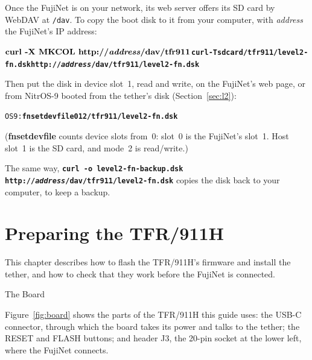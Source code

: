 \documentclass[10pt,twoside,openany]{book}
\makeatletter
\newcommand{\cmd}[1]{\textbf{#1}}            %
\newcommand{\var}[1]{\textit{#1}}            %
\newcommand{\file}[1]{\texttt{#1}}           %
\newcommand{\key}[1]{\textsf{\small #1}}     %
\newcommand{\type}[1]{\texttt{\textbf{#1}}}  %
\newenvironment{ex}{\par\vspace{0.3ex}\small\begin{alltt}}{\end{alltt}\vspace{0.3ex}}
\newcommand{\thesectname}{}
\newcommand{\chapterpages}{%
  \renewcommand{\thepage}{\thechapter--\arabic{page}}\setcounter{page}{1}}
\renewcommand{\section}{\@startsection{section}{1}{0pt}{3.2ex plus 1ex}{1.2ex}%
  {\sffamily\bfseries\large}}
\makeatother
\begin{document}
Once the FujiNet is on your network, its web server offers its SD card by
WebDAV at \file{/dav}. To copy the boot disk to it from your computer, with
\var{address} the FujiNet's IP address:
\begin{ex}
$ \textbf{curl -X MKCOL http://\var{address}/dav/tfr911}
$ \textbf{curl -T sdcard/tfr911/level2-fn.dsk http://\var{address}/dav/tfr911/level2-fn.dsk}
\end{ex}
Then put the disk in device slot~1, read and write, on the FujiNet's web
page, or from NitrOS-9 booted from the tether's disk (Section~\ref{sec:l2}):
\begin{ex}
OS9: \textbf{fnsetdevfile 0 1 2 /tfr911/level2-fn.dsk}
\end{ex}
(\cmd{fnsetdevfile} counts device slots from~0: slot~0 is the FujiNet's
slot~1. Host slot~1 is the SD card, and mode~2 is read/write.)

The same way, \type{curl -o level2-fn-backup.dsk
http://\var{address}/dav/tfr911/level2-fn.dsk} copies the disk back to
your computer, to keep a backup.

\chapter{Preparing the TFR/911H}
\chapterpages
\renewcommand{\thesectname}{Preparing the TFR/911H}

This chapter describes how to flash the TFR/911H's firmware and install
the tether, and how to check that they work before the FujiNet is
connected.

\section{The Board}

Figure~\ref{fig:board} shows the parts of the TFR/911H this guide uses:
the USB-C connector, through which the board takes its power and talks
to the tether; the \key{RESET} and \key{FLASH} buttons; and header J3,
the 20-pin socket at the lower left, where the FujiNet connects.
\end{document}
